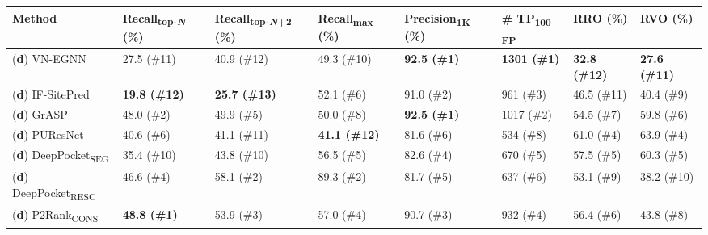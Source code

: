 \begingroup
\captionsetup{belowskip=0pt,aboveskip=9pt} %
\begin{landscape}
\begin{longtable}[c]{|M{29mm}|M{29mm}|M{31mm}|M{27mm}|M{30mm}|M{19mm}|M{18mm}|M{18mm}|}
\hline
\textbf{Method}         & \textbf{Recall\textsubscript{top-\textit{N}}} (\%) & \textbf{Recall\textsubscript{top-\textit{N}+2}} (\%) & \textbf{Recall\textsubscript{max}} (\%) & \textbf{Precision\textsubscript{1K}} (\%) & \textbf{\# TP\textsubscript{100 FP}} & \textbf{RRO} (\%) & \textbf{RVO} (\%) \\ \hline
\endfirsthead
%
\footnotesize{(\textbf{d})} VN-EGNN        & 27.5 (\#11)           & 40.9 (\#12)             & 49.3 (\#10)         & \textbf{\textcolor{CBBlue}{92.5 (\#1)}}                   & \textbf{\textcolor{CBBlue}{1301 (\#1)}}               & \textbf{\textcolor{CBOrange}{32.8 (\#12)}}             & \textbf{\textcolor{CBOrange}{27.6 (\#11)}}             \\ \hline
\footnotesize{(\textbf{d})} IF-SitePred    & \textbf{\textcolor{CBOrange}{19.8 (\#12) }}           & \textbf{\textcolor{CBOrange}{25.7 (\#13)}}             & 52.1 (\#6)         & 91.0 (\#2)             & 961 (\#3)         & 46.5 (\#11)     & 40.4 (\#9)     \\ \hline
\footnotesize{(\textbf{d})} GrASP          & 48.0 (\#2)              & 49.9 (\#5)             & 50.0 (\#8)           & \textbf{\textcolor{CBBlue}{92.5 (\#1)}}                   & 1017 (\#2)       & 54.5 (\#7)     & 59.8 (\#6)     \\ \hline
\footnotesize{(\textbf{d})} PUResNet       & 40.6 (\#6)            & 41.1 (\#11)             & \textbf{\textcolor{CBOrange}{41.1 (\#12)}}         & 81.6 (\#6)           & 534 (\#8)         & 61.0 (\#4)     & 63.9 (\#4)     \\ \hline
\footnotesize{(\textbf{d})} DeepPocket\textsubscript{SEG}  & 35.4 (\#10)            & 43.8 (\#10)             & 56.5 (\#5)         & 82.6 (\#4)           & 670 (\#5)         & 57.5 (\#5)     & 60.3 (\#5)     \\ \hline
\footnotesize{(\textbf{d})} DeepPocket\textsubscript{RESC} & 46.6 (\#4)            & 58.1 (\#2)                     & 89.3 (\#2)         & 81.7 (\#5)          & 637 (\#6)         & 53.1 (\#9)     & 38.2 (\#10)     \\ \hline
\footnotesize{(\textbf{d})} P2Rank\textsubscript{CONS}     & \textbf{\textcolor{CBBlue}{48.8 (\#1)}}           & 53.9 (\#3)             & 57.0 (\#4)           & 90.7 (\#3)           & 932 (\#4)         & 56.4 (\#6)     & 43.8 (\#8)     \\ \hline

\end{longtable}
\end{landscape}

